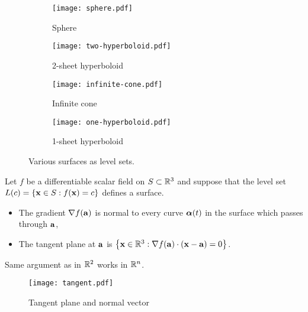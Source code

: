 \begin{figure}[htb]
    \begin{center}
        \begin{subfigure}[b]{0.24\textwidth}
            \centering
            \texttt{[image: sphere.pdf]}
            \caption{Sphere}%
            \label{fig:sphere}
        \end{subfigure}
        \hfill
        \begin{subfigure}[b]{0.24\textwidth}
            \centering
            \texttt{[image: two-hyperboloid.pdf]}
            \caption{2-sheet hyperboloid}%
            \label{fig:two-hyperboloid}
        \end{subfigure}
        \hfill
        \begin{subfigure}[b]{0.24\textwidth}
            \centering
            \texttt{[image: infinite-cone.pdf]}
            \caption{Infinite cone}%
            \label{fig:infinite-cone}
        \end{subfigure}
        \hfill
        \begin{subfigure}[b]{0.24\textwidth}
            \centering
            \texttt{[image: one-hyperboloid.pdf]}
            \caption{1-sheet hyperboloid}%
            \label{fig:one-hyperboloid}
        \end{subfigure}
        \caption{Various surfaces as level sets.}%
        \label{fig:level-sets}
    \end{center}
\end{figure}


Let \(f\) be a differentiable scalar field on \(S\subset \bR^3\) and suppose that the level set \(L(c) = \left\{\xx\in S : f(\xx)=c\right\}\) defines a surface.

\begin{itemize}
    \item The gradient \(\nabla f(\aa)\) is normal to every curve \(\aalpha(t)\) in the surface which passes through \(\aa\),
    \item The tangent plane at \(\aa\) is
          \(\left\{\xx\in\bR^3: \nabla f(\aa) \cdot (\xx-\aa)=0\right\}\).
\end{itemize}

Same argument as in \(\bR^2\) works in \(\bR^n\).


\begin{figure}
    \centering
    \texttt{[image: tangent.pdf]}
    \caption{Tangent plane and normal vector}
\end{figure}


